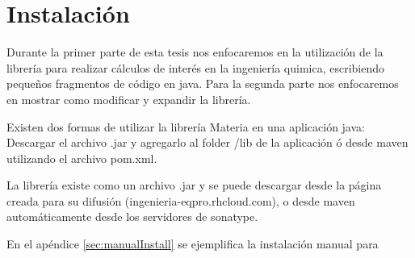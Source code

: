 

\chapter{Instalación}


  Durante la primer parte de esta tesis nos enfocaremos en la utilización de la librería para realizar cálculos de interés en la ingeniería quimica, escribiendo pequeños fragmentos de código en java. Para la segunda parte nos enfocaremos en mostrar como modificar y expandir la librería.

	Existen dos formas de utilizar la librería Materia en una aplicación java:
  Descargar el archivo .jar y agregarlo al folder /lib de la aplicación ó desde maven utilizando el archivo pom.xml.

  La librería existe como un archivo .jar y se puede descargar desde la página creada para su difusión (ingenieria-eqpro.rhcloud.com), o desde maven automáticamente desde los servidores de sonatype.

  En el apéndice \ref{sec:manualInstall} se ejemplifica la instalación manual para 




 

